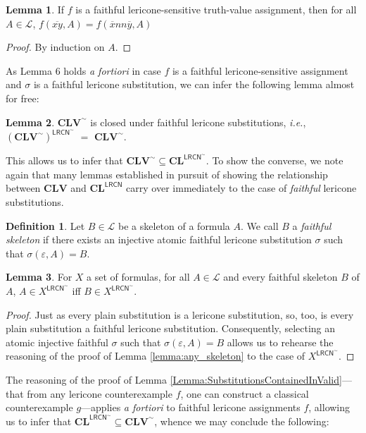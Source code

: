 \documentclass{amsart}
\theoremstyle{definition}
\newtheorem{lemma}{Lemma}
\newtheorem{mdef}{Definition}
\newcommand{\LL}{\mathcal{L}}
\newcommand{\LRCN}{\mathsf{LRCN}}
\begin{document}
\begin{lemma}
    If $f$ is a faithful lericone-sensitive truth-value assignment, then for all $A\in\LL$, $f(\overline{xy},A)=f(\overline{x}nn\overline{y},A)$
\end{lemma}
\begin{proof}
    By induction on $A$.
\end{proof}

As Lemma 6 holds \emph{a fortiori} in case $f$ is a faithful lericone-sensitive assignment and $\sigma$ is a faithful lericone substitution, we can infer the following lemma almost for free:

\begin{lemma}
    $\mathbf{CLV}^{\sim}$ is closed under faithful lericone substitutions, \emph{i.e.}, $(\mathbf{CLV}^{\sim})^{\LRCN^{\sim}}$ $=$ $\mathbf{CLV}^{\sim}$.
\end{lemma}

This allows us to infer that $\mathbf{CLV}^{\sim}\subseteq\mathbf{CL}^{\LRCN^{\sim}}$. To show the converse, we note again that many lemmas established in pursuit of showing the relationship between $\mathbf{CLV}$ and $\mathbf{CL}^{\LRCN}$ carry over immediately to the case of \emph{faithful} lericone substitutions.

\begin{mdef}
Let $B\in\mathcal{L}$ be a skeleton of a formula $A$. We call $B$ a \emph{faithful skeleton} if there exists an injective atomic faithful lericone substitution $\sigma$ such that $\sigma(\varepsilon, A)=B$.
\end{mdef}

\begin{lemma}
    For $X$ a set of formulas, for all $A\in\mathcal{L}$ and every faithful skeleton $B$ of $A$, $A\in X^{\LRCN^{\sim}}$ iff $B\in X^{\LRCN^{\sim}}$.
\end{lemma}

\begin{proof}
    Just as every plain substitution is a lericone substitution, so, too, is every plain substitution a faithful lericone substitution. Consequently, selecting an atomic injective faithful $\sigma$ such that $\sigma(\varepsilon,A)=B$ allows us to rehearse the reasoning of the proof of Lemma \ref{lemma:any_skeleton} to the case of $X^{\LRCN^{\sim}}$.
\end{proof}

The reasoning of the proof of Lemma \ref{Lemma:SubstitutionsContainedInValid}---that from any lericone counterexample $f$, one can construct a classical counterexample $g$---applies \emph{a fortiori} to faithful lericone assignments $f$, allowing us to infer that $\mathbf{CL}^{\LRCN^{\sim}}\subseteq\mathbf{CLV}^{\sim}$, whence we may conclude the following:
\end{document}
